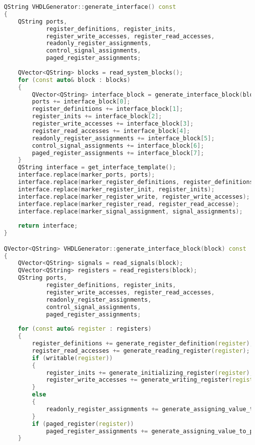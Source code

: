 \begin{lstlisting}[language=C++]
QString VHDLGenerator::generate_interface() const
{
    QString ports,
            register_definitions, register_inits,
            register_write_accesses, register_read_accesses,
            readonly_register_assignments,
            control_signal_assignments,
            paged_register_assignments;
            
    QVector<QString> blocks = read_system_blocks();
    for (const auto& block : blocks)
    {
        QVector<QString> interface_block = generate_interface_block(block);
        ports += interface_block[0];
        register_definitions += interface_block[1];
        register_inits += interface_block[2];
        register_write_accesses += interface_block[3];
        register_read_accesses += interface_block[4];
        readonly_register_assignments += interface_block[5];
        control_signal_assignments += interface_block[6];
        paged_register_assignments += interface_block[7];
    }
    QString interface = get_interface_template();
    interface.replace(marker_ports, ports);
    interface.replace(marker_register_definitions, register_definitions);
    interface.replace(marker_register_init, register_inits);
    interface.replace(marker_register_write, register_write_accesses);
    interface.replace(marker_register_read, register_read_accesse);
    interface.replace(marker_signal_assignment, signal_assignments);
      
    return interface;
}

QVector<QString> VHDLGenerator::generate_interface_block(block) const
{
    QVector<QString> signals = read_signals(block);
    QVector<QString> registers = read_registers(block);
    QString ports,
            register_definitions, register_inits,
            register_write_accesses, register_read_accesses,
            readonly_register_assignments, 
            control_signal_assignments, 
            paged_register_assignments;
            
    for (const auto& register : registers)
    {
        register_definitions += generate_register_definition(register);
        register_read_accesses += generate_reading_register(register);
        if (writable(register))
        {
            register_inits += generate_initializing_register(register);
            register_write_accesses += generate_writing_register(register);
        }
        else
        {
            readonly_register_assignments += generate_assigning_value_to_readonly_register(register);
        }
        if (paged_register(register))
            paged_register_assignments += generate_assigning_value_to_paged_register(register);
    }
    

\end{lstlisting}
